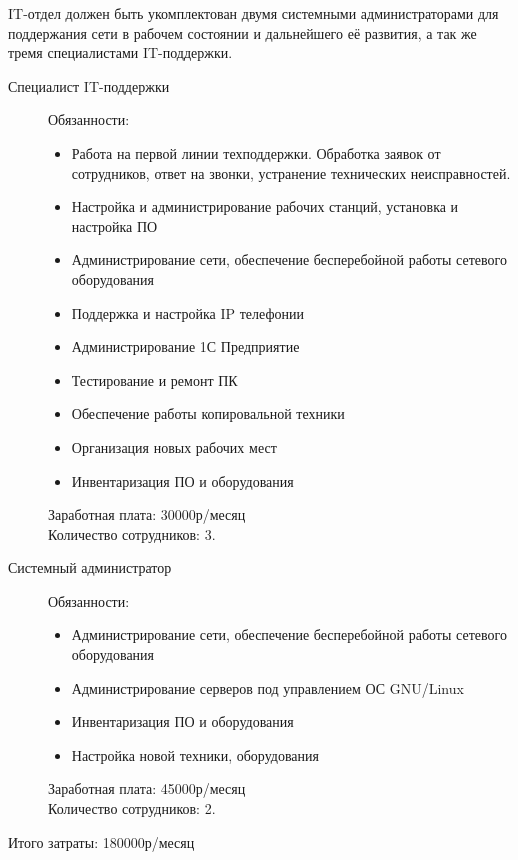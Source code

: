 IT-отдел должен быть укомплектован двумя системными администраторами для поддержания сети в рабочем состоянии и дальнейшего её развития, а так же тремя специалистами IT-поддержки.

\begin{description}
\item[Специалист IT-поддержки]
  Обязанности:
  \begin{itemize}
  \item Работа на первой линии техподдержки. Обработка заявок от сотрудников, ответ на звонки, устранение технических неисправностей. 
  \item Настройка и администрирование рабочих станций, установка и настройка ПО
  \item Администрирование сети, обеспечение бесперебойной работы сетевого оборудования
  \item Поддержка и настройка IP телефонии
  \item Администрирование 1С Предприятие
  \item Тестирование и ремонт ПК
  \item Обеспечение работы копировальной техники
  \item Организация новых рабочих мест
  \item Инвентаризация ПО и оборудования
  \end{itemize}

  Заработная плата: 30000р/месяц\\
  Количество сотрудников: 3.
\item[Системный администратор]
  Обязанности:
  \begin{itemize}
  \item Администрирование сети, обеспечение бесперебойной работы сетевого оборудования
  \item Администрирование серверов под управлением ОС GNU/Linux
  \item Инвентаризация ПО и оборудования
  \item Настройка новой техники, оборудования
  \end{itemize}
  Заработная плата: 45000р/месяц\\
  Количество сотрудников: 2.
\end{description}

Итого затраты: 180000р/месяц

